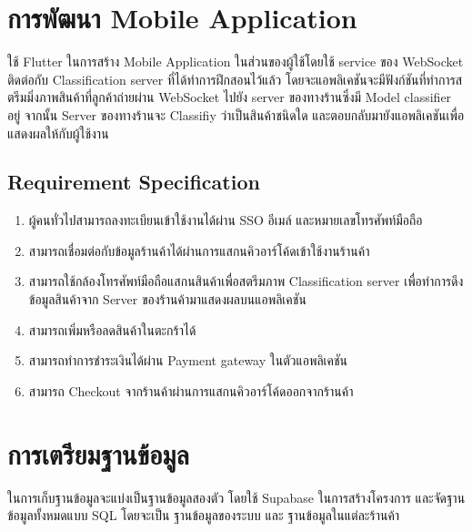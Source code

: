 \newpage

\section{การพัฒนา Mobile Application}
ใช้ Flutter ในการสร้าง Mobile Application ในส่วนของผู้ใช้โดยใช้ service ของ WebSocket ติดต่อกับ Classification server ที่ได้ทำการฝึกสอนไว้แล้ว
โดยจะแอพลิเคชันจะมีฟังก์ชันที่ทำการสตรีมมิ่งภาพสินค้าที่ลูกค้าถ่ายผ่าน WebSocket ไปยัง server ของทางร้านซึ่งมี Model classifier อยู่
จากนั้น Server ของทางร้านจะ Classifiy ว่าเป็นสินค้าชนิดใด และตอบกลับมายังแอพลิเคชันเพื่อแสดงผลให้กับผู้ใช้งาน
\subsection{Requirement Specification}

\begin{enumerate}
  \item ผู้คนทั่วไปสามารถลงทะเบียนเข้าใช้งานได้ผ่าน SSO อีเมล์ และหมายเลขโทรศัพท์มือถือ
  \item สามารถเชื่อมต่อกับข้อมูลร้านค้าได้ผ่านการแสกนคิวอาร์โค้ดเข้าใช้งานร้านค้า
  \item สามารถใช้กล้องโทรศัพท์มือถือแสกนสินค้าเพื่อสตรีมภาพ Classification server เพื่อทำการดึงข้อมูลสินค้าจาก Server ของร้านค้ามาแสดงผลบนแอพลิเคชัน
  \item สามารถเพิ่มหรือลดสินค้าในตะกร้าได้
  \item สามารถทำการชำระเงินได้ผ่าน Payment gateway ในตัวแอพลิเคชัน
  \item สามารถ Checkout จากร้านค้าผ่านการแสกนคิวอาร์โค้ดออกจากร้านค้า

\end{enumerate}


\section{การเตรียมฐานข้อมูล}
ในการเก็บฐานข้อมูลจะแบ่งเป็นฐานข้อมูลสองตัว โดยใช้ Supabase
ในการสร้างโครงการ และจัดฐานข้อมูลทั้งหมดแบบ SQL  โดยจะเป็น ฐานข้อมูลของระบบ และ ฐานข้อมูลในแต่ละร้านค้า




